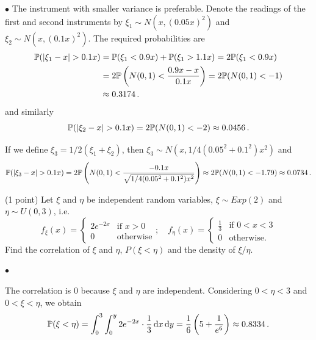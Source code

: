 \documentclass[a4paper]{report}
\begin{document}
$\bullet$
The instrument with smaller variance is preferable. Denote the readings
of the first and second instruments by $\xi_1\sim N(x,(0.05x)^2)$ and
$\xi_2\sim N(x,(0.1x)^2)$. The required probabilities are
\begin{align*}
\P(|\xi_1 - x| > 0.1x) &= \P(\xi_1 < 0.9x) + \P(\xi_1 > 1.1x)
= 2\P(\xi_1 < 0.9x) \\&= 2 \P\left(N(0,1) < \frac{0.9x - x}{0.1x}\right)
 = 2\P(N(0,1) < -1) \\
 &\approx
 0.3174 \, .
\end{align*}
and similarly
\[
\P(|\xi_2 - x| > 0.1x) = 2 \P(N(0,1) < -2) \approx 0.0456
\, .
\]

If we define $\xi_3=1/2(\xi_1+\xi_2)$, then
$\xi_3\sim N(x,1/4(0.05^2+0.1^2)x^2)$ and
\[
\P(|\xi_3 - x| > 0.1x) = 2  \P\left(N(0,1) < \frac{-0.1x}{
\sqrt{1/4( 0.05^2 + 0.1^2)x^2 }}\right)\approx
2\P(N(0,1) < -1.79) \approx 0.0734 \, .
\]



\begin{problem} (1 point)
Let $\xi$ and $\eta$ be independent random variables,
$\xi\sim Exp(2)$ and $\eta\sim U(0,3)$, i.e.
\[
f_\xi(x) = \begin{cases}
2 e^{-2x} & \text{if } x >0\\
0 & \text{otherwise}
\end{cases}; \quad
f_\eta(x) = \begin{cases}
\frac13 & \text{if } 0<x <3\\
0 & \text{otherwise.}
\end{cases}\]
Find the correlation of $\xi$ and $\eta$, $P(\xi<\eta)$ and the density
of $\xi/\eta$.

\end{problem}

$\bullet$

The correlation is 0 because $\xi$ and $\eta$ are independent. Considering
$0<\eta<3$ and $0<\xi<\eta$, we obtain
\[
\P(\xi < \eta) =
\int_0^3\int_0^y 2e^{-2x}\cdot\frac13 \d x \d y
=\frac16\left(5 + \frac{1}{e^6}\right) \approx 0.8334 \, .
\]
\end{document}
